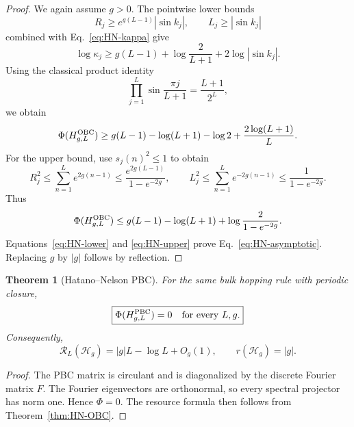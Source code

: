 \documentclass[reprint,amsmath,amssymb,aps,nofootinbib]{revtex4-2}
\newtheorem{theorem}{Theorem}
\newcommand{\PhiC}{\Phi}
\begin{document}
\begin{proof}
We again assume $g>0$. The pointwise lower bounds
\begin{equation}
R_j\ge e^{g(L-1)}|\sin k_j|,
\qquad
L_j\ge |\sin k_j|
\end{equation}
combined with Eq.~\eqref{eq:HN-kappa} give
\begin{equation}
\log\kappa_j
\ge g(L-1)+\log\frac{2}{L+1}+2\log|\sin k_j|.
\end{equation}
Using the classical product identity
\begin{equation}
\prod_{j=1}^L\sin\frac{\pi j}{L+1}
=\frac{L+1}{2^L},
\end{equation}
we obtain
\begin{equation}
\PhiC(H_{g,L}^{\rm OBC})
\ge g(L-1)-\log(L+1)-\log2
+\frac{2\log(L+1)}{L}.
\label{eq:HN-lower}
\end{equation}
For the upper bound, use $s_j(n)^2\le1$ to obtain
\begin{equation}
R_j^2\le\sum_{n=1}^Le^{2g(n-1)}
\le\frac{e^{2g(L-1)}}{1-e^{-2g}},
\qquad
L_j^2\le\sum_{n=1}^Le^{-2g(n-1)}
\le\frac{1}{1-e^{-2g}}.
\end{equation}
Thus
\begin{equation}
\PhiC(H_{g,L}^{\rm OBC})
\le g(L-1)-\log(L+1)
+\log\frac{2}{1-e^{-2g}}.
\label{eq:HN-upper}
\end{equation}
Equations~\eqref{eq:HN-lower} and \eqref{eq:HN-upper} prove
Eq.~\eqref{eq:HN-asymptotic}. Replacing $g$ by $|g|$ follows by reflection.
\end{proof}

\begin{theorem}[Hatano--Nelson PBC]
\label{thm:HN-PBC}
For the same bulk hopping rule with periodic closure,
\begin{equation}
\boxed{
\PhiC(H_{g,L}^{\rm PBC})=0
\quad\text{for every }L,g.
}
\end{equation}
Consequently,
\begin{equation}
\boxed{
\mathcal R_L(\mathscr H_g)
=|g|L-\log L+O_g(1),
\qquad
r(\mathscr H_g)=|g|.
}
\label{eq:HN-resource}
\end{equation}
\end{theorem}

\begin{proof}
The PBC matrix is circulant and is diagonalized by the discrete Fourier matrix
$F$. The Fourier eigenvectors are orthonormal, so every spectral projector has
norm one. Hence \(\PhiC=0\). The resource formula then follows from
Theorem~\ref{thm:HN-OBC}.
\end{proof}
\end{document}

